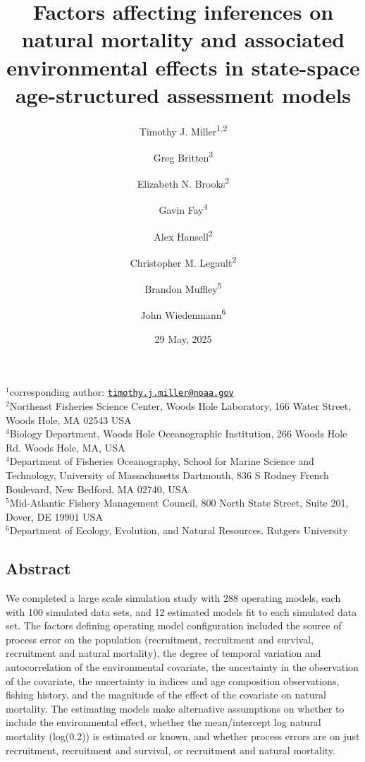 \documentclass[
  12pt,
]{article}
\title{Factors affecting inferences on natural mortality and associated environmental effects in state-space age-structured assessment models}
\author{Timothy J. Miller\textsuperscript{1,2} \and Greg Britten\textsuperscript{3} \and Elizabeth N. Brooks\textsuperscript{2} \and Gavin Fay\textsuperscript{4} \and Alex Hansell\textsuperscript{2} \and Christopher M. Legault\textsuperscript{2} \and Brandon Muffley\textsuperscript{5} \and John Wiedenmann\textsuperscript{6}}
\date{29 May, 2025}
\begin{document}
\maketitle

\(^1\)corresponding author: \href{mailto:timothy.j.miller@noaa.gov}{\nolinkurl{timothy.j.miller@noaa.gov}}\\
\(^2\)Northeast Fisheries Science Center, Woods Hole Laboratory, 166 Water Street, Woods Hole, MA 02543 USA\\
\(^3\)Biology Department, Woods Hole Oceanographic Institution, 266 Woods Hole Rd. Woods Hole, MA, USA\\
\(^4\)Department of Fisheries Oceanography, School for Marine Science and Technology, University of Massachusetts Dartmouth, 836 S Rodney French Boulevard, New Bedford, MA 02740, USA\\
\(^5\)Mid-Atlantic Fishery Management Council, 800 North State Street, Suite 201, Dover, DE 19901 USA\\
\(^6\)Department of Ecology, Evolution, and Natural Resources. Rutgers University\\

\pagebreak

\hypertarget{abstract}{%
\subsection*{Abstract}\label{abstract}}

We completed a large scale simulation study with 288 operating models, each with 100 simulated data sets, and 12 estimated models fit to each simulated data set. The factors defining operating model configuration included the source of process error on the population (recruitment, recruitment and survival, recruitment and natural mortality), the degree of temporal variation and autocorrelation of the environmental covariate, the uncertainty in the observation of the covariate, the uncertainty in indices and age composition observations, fishing history, and the magnitude of the effect of the covariate on natural mortality. The estimating models make alternative assumptions on whether to include the environmental effect, whether the mean/intercept log natural mortality (log(0.2)) is estimated or known, and whether process errors are on just recruitment, recruitment and survival, or recruitment and natural mortality.
\end{document}
